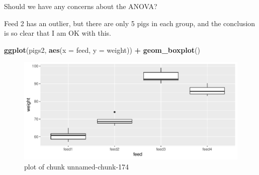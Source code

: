 \documentclass[ignorenonframetext,]{beamer}
\newenvironment{Shaded}{\begin{snugshade}}{\end{snugshade}}
\newcommand{\DataTypeTok}[1]{\textcolor[rgb]{0.13,0.29,0.53}{#1}}
\newcommand{\KeywordTok}[1]{\textcolor[rgb]{0.13,0.29,0.53}{\textbf{#1}}}
\newcommand{\NormalTok}[1]{#1}
\newcommand{\OperatorTok}[1]{\textcolor[rgb]{0.81,0.36,0.00}{\textbf{#1}}}
\newcommand{\StringTok}[1]{\textcolor[rgb]{0.31,0.60,0.02}{#1}}
\begin{document}
\begin{frame}[fragile]{Should we have any concerns about the ANOVA?}
\protect\hypertarget{should-we-have-any-concerns-about-the-anova}{}

Feed 2 has an outlier, but there are only 5 pigs in each group, and the
conclusion is so clear that I am OK with this.

\begin{Shaded}
\begin{Highlighting}[]
\KeywordTok{ggplot}\NormalTok{(pigs2, }\KeywordTok{aes}\NormalTok{(}\DataTypeTok{x =}\NormalTok{ feed, }\DataTypeTok{y =}\NormalTok{ weight)) }\OperatorTok{+}\StringTok{ }\KeywordTok{geom_boxplot}\NormalTok{()}
\end{Highlighting}
\end{Shaded}

\begin{figure}
\centering
\includegraphics{figure/unnamed-chunk-174-1.pdf}
\caption{plot of chunk unnamed-chunk-174}
\end{figure}

\end{frame}
\end{document}
